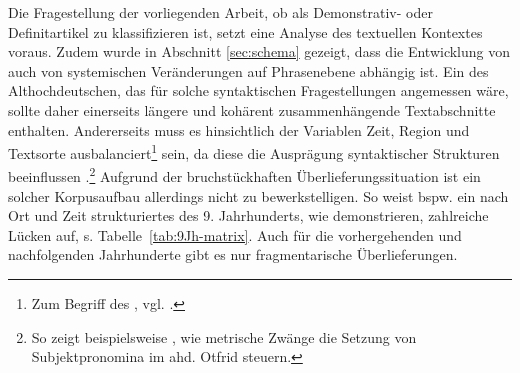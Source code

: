 Die Fragestellung der vorliegenden Arbeit, ob  als Demonstrativ-  oder Definitartikel  zu klassifizieren ist, setzt eine Analyse des textuellen Kontextes voraus. Zudem wurde in Abschnitt \ref{sec:schema} gezeigt, dass die Entwicklung von  auch von systemischen Veränderungen auf Phrasenebene  abhängig ist. Ein  des Althochdeutschen, das für solche syntaktischen Fragestellungen angemessen wäre, sollte daher einerseits längere und kohärent zusammenhängende Textabschnitte enthalten. Andererseits muss es hinsichtlich der Variablen Zeit, Region und Textsorte ausbalanciert\footnote{Zum Begriff des , vgl. \cite[6]{Atkins1992}.} sein, da diese die Ausprägung syntaktischer Strukturen  beeinflussen \parencite[74]{Fleischer2011}.\footnote{So zeigt beispielsweise \textcite[47]{Eggenberger1961}, wie metrische  Zwänge die Setzung von Subjektpronomina  im ahd. Otfrid steuern.} Aufgrund der bruchstückhaften Überlieferungssituation ist ein solcher Korpusaufbau  allerdings nicht zu bewerkstelligen. So weist bspw. ein nach Ort und Zeit strukturiertes  des 9. Jahrhunderts, wie \textcite{Fleischer2011} demonstrieren, zahlreiche Lücken auf,  s. Tabelle~\ref{tab:9Jh-matrix}. Auch für die vorhergehenden und nachfolgenden Jahrhunderte gibt es nur fragmentarische Überlieferungen.

\begin{table}
\caption{Strukturiertes  des 9. Jh. \parencite[75]{Fleischer2011} (T = Tatian, O = Otfrid, MF = Monseer Fragmente)\label{tab:9Jh-matrix}}
\end{table}  

